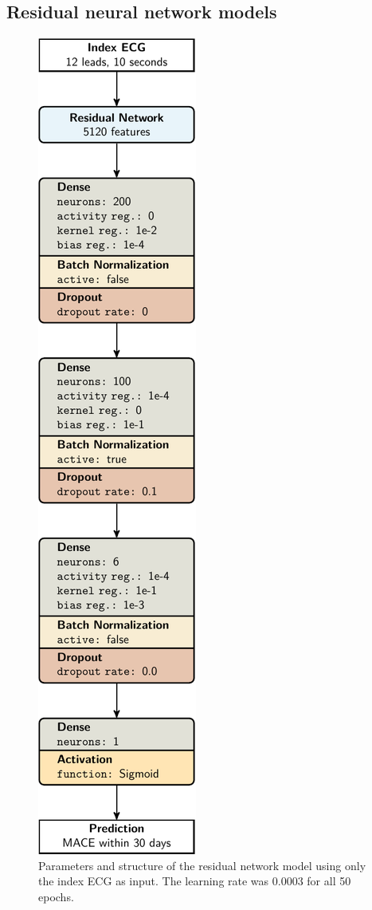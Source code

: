 \documentclass[preprint]{elsarticle}
\begin{document}
\subsection{Residual neural network models}
\begin{figure}[H]
\centering
\includegraphics[scale=\modelscale,keepaspectratio]{figures/model-rn1.pdf}
\caption{Parameters and structure of the residual network model using only the index ECG as input. The learning rate was 0.0003 for all 50 epochs.}
\end{figure}
\end{document}
